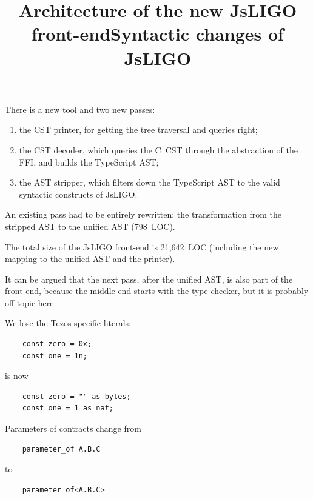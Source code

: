 \documentclass[wide]{slides}
\newcommand{\JsLIGO}[0]{\textsf{JsLIGO}}
\newcommand{\TypeScript}[0]{\textsf{TypeScript}}
\begin{document}
\begin{slide}
  \title{Architecture of the new JsLIGO front-end}

  There is a new tool and two new passes:
  \begin{enumerate}

    \item the CST printer, for getting the tree traversal and queries
      right;

    \item the CST decoder, which queries the C~CST through the
      abstraction of the FFI, and builds the \TypeScript{} AST;

    \item the AST stripper, which filters down the \TypeScript{} AST
      to the valid syntactic constructs of \JsLIGO{}.
  \end{enumerate}

  \medskip

  An existing pass had to be entirely rewritten: the transformation
  from the stripped AST to the unified AST (798~LOC).

  \medskip

  The total size of the \JsLIGO{} front\hyp{}end is 21,642~LOC
  (including the new mapping to the unified AST and the printer).

  \medskip

  It can be argued that the next pass, after the unified AST, is also
  part of the front\hyp{}end, because the middle\hyp{}end starts with
  the type\hyp{}checker, but it is probably off\hyp{}topic here.

\end{slide}

\begin{slide}
  \title{Syntactic changes of JsLIGO}

  We lose the Tezos\hyp{}specific literals:
  \begin{lstlisting}
    const zero = 0x;
    const one = 1n;
  \end{lstlisting}
  is now
  \begin{lstlisting}
    const zero = "" as bytes;
    const one = 1 as nat;
  \end{lstlisting}

  Parameters of contracts change from
  \begin{lstlisting}
    parameter_of A.B.C
  \end{lstlisting}
  to
  \begin{lstlisting}
    parameter_of<A.B.C>
  \end{lstlisting}

\end{slide}
\end{document}
